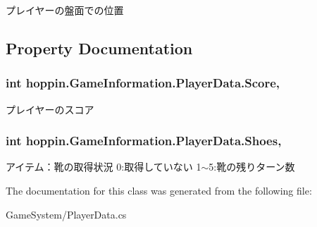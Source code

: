 プレイヤーの盤面での位置 



\subsection{Property Documentation}
\subsubsection[{\texorpdfstring{Score}{Score}}]{\setlength{\rightskip}{0pt plus 5cm}int hoppin.\+Game\+Information.\+Player\+Data.\+Score\hspace{0.3cm}{\ttfamily [get]}, {\ttfamily [set]}}\hypertarget{classhoppin_1_1_game_information_1_1_player_data_a61a1a834ed76d7d587fb9a58fba7a8a7}{}\label{classhoppin_1_1_game_information_1_1_player_data_a61a1a834ed76d7d587fb9a58fba7a8a7}


プレイヤーのスコア 

\subsubsection[{\texorpdfstring{Shoes}{Shoes}}]{\setlength{\rightskip}{0pt plus 5cm}int hoppin.\+Game\+Information.\+Player\+Data.\+Shoes\hspace{0.3cm}{\ttfamily [get]}, {\ttfamily [set]}}\hypertarget{classhoppin_1_1_game_information_1_1_player_data_a0a11513a7d0d688b096f5617915196f5}{}\label{classhoppin_1_1_game_information_1_1_player_data_a0a11513a7d0d688b096f5617915196f5}


アイテム：靴の取得状況 0\+:取得していない 1$\sim$5\+:靴の残りターン数 



The documentation for this class was generated from the following file\+:\begin{DoxyCompactItemize}
\item 
Game\+System/Player\+Data.\+cs\end{DoxyCompactItemize}
